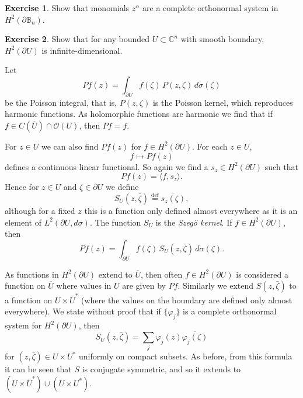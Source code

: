 \documentclass[12pt,openany]{book}
\newcommand{\linnprod}[2]{\langle #1 , #2 \rangle}
\newcommand{\C}{{\mathbb{C}}}
\newcommand{\bB}{{\mathbb{B}}}
\newcommand{\sO}{{\mathscr{O}}}
\newcommand{\myindex}[1]{#1\index{#1}}
\theoremstyle{plain}
\theoremstyle{remark}
\theoremstyle{definition}
\newenvironment{exbox}{%
    \def\FrameCommand{\vrule width 1pt \relax\hspace {10pt}}%
    \MakeFramed {\advance \hsize -\width \FrameRestore }%
}{%
    \endMakeFramed
}
\theoremstyle{exercise}
\newtheorem{exercise}{Exercise}[section]
\theoremstyle{example}
\begin{document}
\begin{exbox}
\begin{exercise}
Show that monomials $z^\alpha$ are a complete orthonormal system in
$H^2(\partial \bB_n)$.
\end{exercise}

\begin{exercise}
Show that for any bounded $U \subset \C^n$ with smooth boundary,
$H^2(\partial U)$ is infinite-dimensional.
\end{exercise}
\end{exbox}

Let
\begin{equation*}
Pf(z) = \int_{\partial U} f(\zeta) \, P(z,\zeta) \, d \sigma(\zeta)
\end{equation*}
be the Poisson integral, that is, $P(z,\zeta)$ is the Poisson kernel, which
reproduces harmonic functions.  As holomorphic functions are harmonic we
find that if $f \in C(\overline{U}) \cap \sO(U)$, then $Pf = f$.

For $z \in U$ we can also find $Pf(z)$ for $f \in H^2(\partial U)$.  
For each $z \in U$,
\begin{equation*}
f \mapsto Pf(z)
\end{equation*}
defines a continuous linear functional.  So again we find a $s_z \in
H^2(\partial U)$ such that
\begin{equation*}
Pf(z) = \linnprod{f}{s_z} .
\end{equation*}
Hence for $z \in U$ and $\zeta \in \partial U$ we define
%
\begin{equation*}
S_U(z,\bar{\zeta}) \overset{\text{def}}{=} \overline{s_z(\zeta)} ,
\end{equation*}
although for a fixed $z$ this is a function only defined almost everywhere
as it is an element of $L^2(\partial U,d\sigma)$.
The function $S_U$ is the \emph{\myindex{Szeg{\"o} kernel}}.
If $f \in H^2(\partial U)$, then
\begin{equation*}
Pf(z) = \int_{\partial U} f(\zeta) \, S_U(z,\bar{\zeta}) \, d\sigma(\zeta) .
\end{equation*}

As functions in $H^2(\partial U)$ extend to $\overline{U}$, then often
$f \in H^2(\partial U)$ is considered a function on
$\overline{U}$ where values in $U$ are given by $Pf$.  Similarly we 
extend $S(z,\bar{\zeta})$ to a function on $U \times \overline{U}^*$ (where
the values on the boundary are defined only almost everywhere).
We state without proof that if $\{ \varphi_j \}$ is a complete
orthonormal system for $H^2(\partial U)$, then 
\begin{equation} \label{eq:formulaszego}
S_U(z,\bar{\zeta}) = \sum_{j} \varphi_j(z)\overline{\varphi_j(\zeta)}
\end{equation}
for $(z,\bar{\zeta}) \in U \times U^*$ uniformly on compact subsets.
As before, from this formula it can be seen that $S$ is conjugate symmetric,
and so it extends to 
$(U \times \overline{U}^*) \cup (\overline{U} \times U^*)$.
\end{document}
